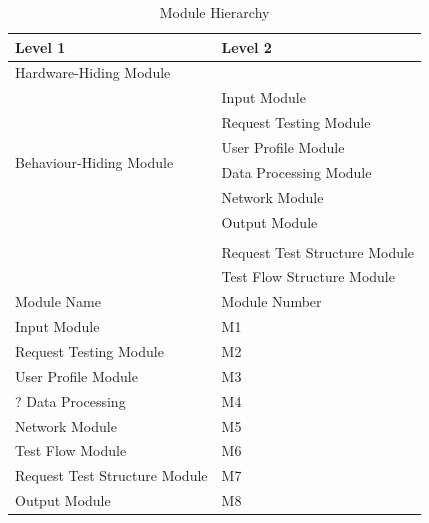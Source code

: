 \documentclass[12pt, titlepage]{article}
\begin{document}
\begin{table}[h!]
\centering
\begin{tabular}{p{} p{}}
\toprule
\textbf{Level 1} & \textbf{Level 2}\\
\midrule

{Hardware-Hiding Module} & ~ \\
\midrule

\multirow{7}{0.3\textwidth}{Behaviour-Hiding Module}
& Input Module\\
& Request Testing Module\\
& User Profile Module\\
& Data Processing Module\\
& Network Module\\
& Output Module\\
\midrule

\multirow{3}{0.3\textwidth}{Software Decision Module}\\
& Request Test Structure Module\\
& Test Flow Structure Module\\
\midrule
{Module Name} & {Module Number}\\
\midrule
Input Module & M1\\
Request Testing Module & M2\\
User Profile Module & M3\\?
Data Processing & M4\\
Network Module & M5\\
Test Flow Module & M6\\
Request Test Structure Module & M7\\
Output Module & M8\\
\bottomrule

\end{tabular}
\caption{Module Hierarchy}
\label{TblMH}
\end{table}
\newpage

\end{document}
